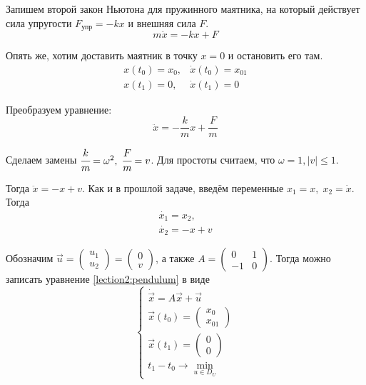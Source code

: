 Запишем второй закон Ньютона для пружинного маятника, на который действует сила упругости $F_{\text{упр}} = -kx$ и внешняя сила $F$.
\begin{equation}
    m\ddot{x} = -kx + F
\end{equation}

Опять же, хотим доставить маятник в точку $x = 0$ и остановить его там.
\begin{equation}
    \begin{array}{cc}
        x(t_0) = x_0, & \dot{x}(t_0) = x_{01} \\
        x(t_1) = 0, & \dot{x}(t_1) = 0
    \end{array}
\end{equation}

Преобразуем уравнение:
\begin{equation}
    \ddot{x} = -\frac{k}{m}x + \frac{F}{m}
\end{equation}

Сделаем замены $\cfrac{k}{m} = \omega^2, \; \cfrac{F}{m} = v$.
Для простоты считаем, что $\omega = 1, |v| \leqslant 1$.

Тогда $\ddot{x} = -x + v$.
Как и в прошлой задаче, введём переменные ${x_1 = x}, \; {x_2 = \dot{x}}$.
Тогда 
\begin{align}
    \label{lection2:pendulum}
    \dot{x_1} = x_2, \\
    \dot{x_2} = -x + v
\end{align}

Обозначим ${\vec{u} = \left( \begin{matrix} u_1 \\ u_2 \end{matrix} \right)} = \left( \begin{matrix} 0 \\ v \end{matrix} \right) $,
а также $A = \left(
    \begin{matrix}
        0 & 1 \\
        -1 & 0
    \end{matrix}
\right)$.
Тогда можно записать уравнение \ref{lection2:pendulum} в виде
\begin{equation}
    \begin{cases}
        \dot{\vec{x}} = A\vec{x} + \vec{u} \\
        \vec{x}(t_0) = \left(
            \begin{matrix}
                x_0 \\
                x_{01}
            \end{matrix}
        \right) \\
        \vec{x}(t_1) = \left(
            \begin{matrix}
                0 \\
                0
            \end{matrix}
        \right) \\
        t_1 - t_0 \rightarrow \min\limits_{u \in D_U}
    \end{cases}
\end{equation}

